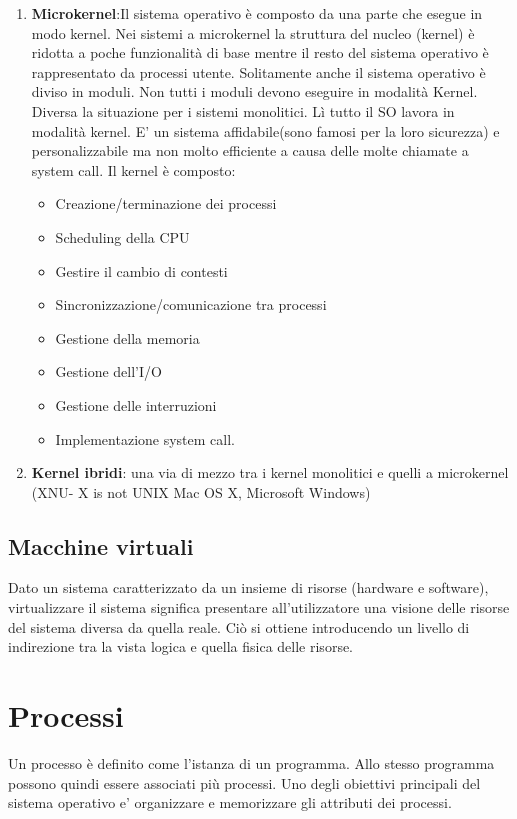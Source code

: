 \documentclass{article}
\begin{document}
\begin{enumerate}
    \item \textbf{Microkernel}:Il sistema operativo è composto da una parte che esegue in modo kernel. 
    Nei sistemi a microkernel la struttura del nucleo (kernel) è ridotta a poche funzionalità di base
    mentre il resto del sistema operativo è rappresentato da processi utente.
    Solitamente anche il sistema operativo è diviso in moduli. Non tutti i moduli devono 
    eseguire in modalità Kernel. Diversa la situazione per i sistemi monolitici. Lì tutto il
    SO lavora in modalità kernel.
    E' un sistema affidabile(sono famosi per la loro sicurezza) e personalizzabile ma non
    molto efficiente a causa delle molte chiamate a system call.
    Il kernel è composto: \begin{itemize}
        \item Creazione/terminazione dei processi   
        \item Scheduling della CPU
        \item Gestire il cambio di contesti
        \item Sincronizzazione/comunicazione tra processi
        \item Gestione della memoria
        \item Gestione dell'I/O
        \item Gestione delle interruzioni
        \item Implementazione system call.
    \end{itemize}

    \item \textbf{Kernel ibridi}: una via di mezzo tra i kernel monolitici e quelli a 
    microkernel (XNU- X is not UNIX Mac OS X,  Microsoft Windows)

\end{enumerate}

\subsection{Macchine virtuali}

Dato un sistema caratterizzato da un insieme di risorse 
(hardware e software), virtualizzare il sistema significa 
presentare all'utilizzatore una visione delle risorse del 
sistema diversa da quella reale.
Ciò si ottiene introducendo un livello di indirezione tra
 la vista logica e quella fisica delle risorse.

\pagebreak
\section{Processi}
Un processo è definito come l'istanza di un programma. Allo stesso programma 
possono quindi essere associati più processi. 
Uno degli obiettivi principali del sistema operativo e' organizzare e memorizzare
gli attributi dei processi.
\end{document}
